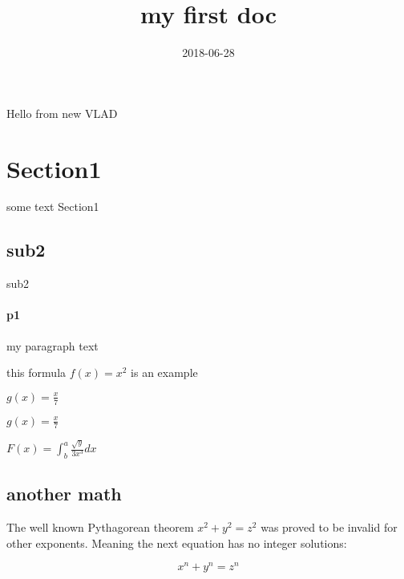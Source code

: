 \documentclass{article}
\title{my first doc}
\date{2018-06-28}
\begin{document}
        Hello from new VLAD
        \section{Section1}
        some text Section1
        \subsection{sub2}
        sub2
        \paragraph{p1}
        my paragraph text

        this formula $f(x)=x^2$ is an example
            
            $g(x)=\frac{x}{7}$

            $g(x)=\frac{x}{7}$

            $F(x)=\int^a_b \frac{\sqrt{y}}{3x^3}dx$

        \subsection{another math}
            The well known Pythagorean theorem 
            \(x^2 + y^2 = z^2\) was 
            proved to be invalid for other exponents. 
            Meaning the next equation has no integer solutions:

            \[ x^n + y^n = z^n \]

        
    
\end{document}
